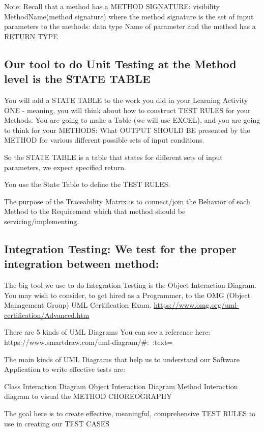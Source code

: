 Note: Recall that a method has a METHOD SIGNATURE: visibility MethodName(method signature)
where the method signature is the set of input parameters to the methods: data type Name of parameter
and the method has a RETURN TYPE

\subsection{Our tool to do Unit Testing at the Method level is the STATE TABLE}
You will add a STATE TABLE to the work you did in your Learning Activity ONE - meaning, you will think about how to construct TEST RULES for your Methods.
You are going to make a Table (we will use EXCEL), and you are going to think for your METHODS: What OUTPUT SHOULD BE presented by the METHOD for various different possible sets of input conditions.

So the STATE TABLE is a table that states for different sets of input parameters, we expect specified return.

You use the State Table to define the TEST RULES.

The purpose of the Traceability Matrix is to connect/join the Behavior of each Method to the Requirement which that method should be servicing/implementing.

\subsection{Integration Testing: We test for the proper integration between method:}

The big tool we use to do Integration Testing is the Object Interaction Diagram.
You may wish to consider, to get hired as a Programmer, to the OMG (Object Management Group) UML Certification Exam.
\url{https://www.omg.org/uml-certification/Advanced.htm}

There are 5 kinds of UML Diagrams
You can see a reference here:
https://www.smartdraw.com/uml-diagram/#:~:text=%

The main kinds of UML Diagrams that help us to understand our Software Application to write effective tests are:

Class Interaction Diagram
Object Interaction Diagram
Method Interaction diagram to visual the METHOD CHOREOGRAPHY

The goal here is to create effective, meaningful, comprehensive TEST RULES to use in creating our TEST CASES

